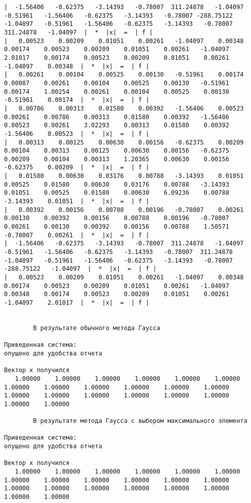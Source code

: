 \documentclass[a4paper,12pt,titlepage,finall]{article}
\begin{document}
\begin{verbatim}
|  -1.56406   -0.62375   -3.14393   -0.78007  311.24878   -1.04097   -0.51961   -1.56406   -0.62375   -3.14393   -0.78007 -288.75122   -1.04097   -0.51961   -1.56406   -0.62375   -3.14393   -0.78007  311.24878   -1.04097  |  *  |x|  =  | f |
|   0.00523    0.00209    0.01051    0.00261   -1.04097    0.00348    0.00174    0.00523    0.00209    0.01051    0.00261   -1.04097    2.01017    0.00174    0.00523    0.00209    0.01051    0.00261   -1.04097    0.00348  |  *  |x|  =  | f |
|   0.00261    0.00104    0.00525    0.00130   -0.51961    0.00174    0.00087    0.00261    0.00104    0.00525    0.00130   -0.51961    0.00174    1.00254    0.00261    0.00104    0.00525    0.00130   -0.51961    0.00174  |  *  |x|  =  | f |
|   0.00786    0.00313    0.01580    0.00392   -1.56406    0.00523    0.00261    0.00786    0.00313    0.01580    0.00392   -1.56406    0.00523    0.00261    3.02293    0.00313    0.01580    0.00392   -1.56406    0.00523  |  *  |x|  =  | f |
|   0.00313    0.00125    0.00630    0.00156   -0.62375    0.00209    0.00104    0.00313    0.00125    0.00630    0.00156   -0.62375    0.00209    0.00104    0.00313    1.20365    0.00630    0.00156   -0.62375    0.00209  |  *  |x|  =  | f |
|   0.01580    0.00630    0.03176    0.00788   -3.14393    0.01051    0.00525    0.01580    0.00630    0.03176    0.00788   -3.14393    0.01051    0.00525    0.01580    0.00630    6.09236    0.00788   -3.14393    0.01051  |  *  |x|  =  | f |
|   0.00392    0.00156    0.00788    0.00196   -0.78007    0.00261    0.00130    0.00392    0.00156    0.00788    0.00196   -0.78007    0.00261    0.00130    0.00392    0.00156    0.00788    1.50571   -0.78007    0.00261  |  *  |x|  =  | f |
|  -1.56406   -0.62375   -3.14393   -0.78007  311.24878   -1.04097   -0.51961   -1.56406   -0.62375   -3.14393   -0.78007  311.24878   -1.04097   -0.51961   -1.56406   -0.62375   -3.14393   -0.78007 -288.75122   -1.04097  |  *  |x|  =  | f |
|   0.00523    0.00209    0.01051    0.00261   -1.04097    0.00348    0.00174    0.00523    0.00209    0.01051    0.00261   -1.04097    0.00348    0.00174    0.00523    0.00209    0.01051    0.00261   -1.04097    2.01017  |  *  |x|  =  | f |


        В результате обычного метода Гаусса

Приведенная система:
опущено для удобства отчета

Вектор х получился
   1.00000    1.00000    1.00000    1.00000    1.00000    1.00000    1.00000    1.00000    1.00000    1.00000    1.00000    1.00000    1.00000    1.00000    1.00000    1.00000    1.00000    1.00000    1.00000    1.00000 

        В результате метода Гаусса с выбором максимального элемента

Приведенная система:
опущено для удобства отчета

Вектор х получился
   1.00000    1.00000    1.00000    1.00000    1.00000    1.00000    1.00000    1.00000    1.00000    1.00000    1.00000    1.00000    1.00000    1.00000    1.00000    1.00000    1.00000    1.00000    1.00000    1.00000 
\end{verbatim}
\end{document}
